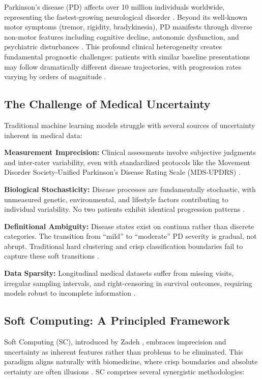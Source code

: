 \documentclass[conference]{IEEEtran}
\begin{document}
Parkinson's disease (PD) affects over 10 million individuals worldwide, representing the fastest-growing neurological disorder \cite{dorsey2018parkinsons}. Beyond its well-known motor symptoms (tremor, rigidity, bradykinesia), PD manifests through diverse non-motor features including cognitive decline, autonomic dysfunction, and psychiatric disturbances \cite{schapira2017nonmotor}. This profound clinical heterogeneity creates fundamental prognostic challenges: patients with similar baseline presentations may follow dramatically different disease trajectories, with progression rates varying by orders of magnitude \cite{fereshtehnejad2017clinical}.

\subsection{The Challenge of Medical Uncertainty}

Traditional machine learning models struggle with several sources of uncertainty inherent in medical data:

\textbf{Measurement Imprecision:} Clinical assessments involve subjective judgments and inter-rater variability, even with standardized protocols like the Movement Disorder Society-Unified Parkinson's Disease Rating Scale (MDS-UPDRS) \cite{goetz2008movement}.

\textbf{Biological Stochasticity:} Disease processes are fundamentally stochastic, with unmeasured genetic, environmental, and lifestyle factors contributing to individual variability. No two patients exhibit identical progression patterns \cite{poewe2017parkinson}.

\textbf{Definitional Ambiguity:} Disease states exist on continua rather than discrete categories. The transition from ``mild'' to ``moderate'' PD severity is gradual, not abrupt. Traditional hard clustering and crisp classification boundaries fail to capture these soft transitions \cite{kuncheva2010fuzzy}.

\textbf{Data Sparsity:} Longitudinal medical datasets suffer from missing visits, irregular sampling intervals, and right-censoring in survival outcomes, requiring models robust to incomplete information \cite{marek2011ppmi}.

\subsection{Soft Computing: A Principled Framework}

Soft Computing (SC), introduced by Zadeh \cite{zadeh1994soft}, embraces imprecision and uncertainty as inherent features rather than problems to be eliminated. This paradigm aligns naturally with biomedicine, where crisp boundaries and absolute certainty are often illusions \cite{torres2006fuzzy}. SC comprises several synergistic methodologies:
\end{document}
